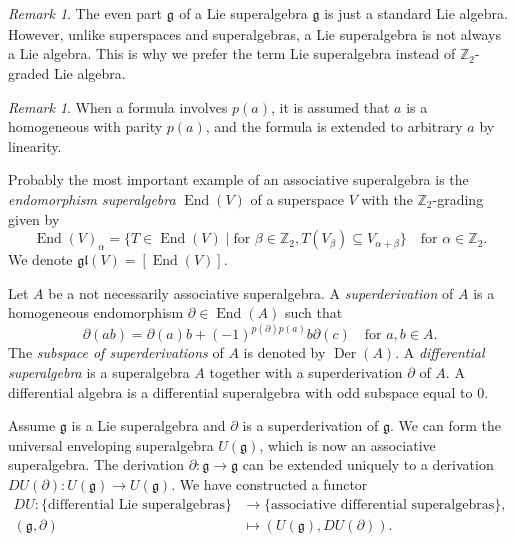 \documentclass[a4paper, 12pt, reqno]{amsart}
\theoremstyle{remark}
\newtheorem{remark}[theorem]{Remark}
\numberwithin{equation}{subsection}
\DeclareMathOperator{\End}{End}
\DeclareMathOperator{\zero}{\overline{0}}
\DeclareMathOperator{\Der}{Der}
\begin{document}
\begin{remark}
  \label{rmk:2}
  The even part $\mathfrak{g}_{\zero}$ of a Lie superalgebra $\mathfrak{g}$ is just a standard Lie algebra.
  However, unlike superspaces and superalgebras, a Lie superalgebra is not always a Lie algebra.
  This is why we prefer the term Lie superalgebra instead of $\mathbb{Z}_2$-graded Lie algebra.
\end{remark}

\begin{remark}
  \label{rmk:3}
  When a formula involves $p(a)$, it is assumed that $a$ is a homogeneous with parity $p(a)$, and the formula is extended to arbitrary $a$ by linearity.
\end{remark}

Probably the most important example of an associative superalgebra is the \emph{endomorphism superalgebra} $\End(V)$ of a superspace $V$ with the $\mathbb{Z}_2$-grading given by
\begin{equation*}
  \End(V)_{\alpha} = \{T \in \End(V) \mid \text{for }\beta \in \mathbb{Z}_2, T(V_{\beta}) \subseteq V_{\alpha + \beta}\} \quad \text{for }\alpha \in \mathbb{Z}_2.
\end{equation*}
We denote $\mathfrak{gl}(V) = [\End(V)]$.

Let $A$ be a not necessarily associative superalgebra.
A \emph{superderivation} of $A$ is a homogeneous endomorphism $\partial \in \End(A)$ such that
\begin{equation*}
  \partial(ab) = \partial(a)b + (-1)^{p(\partial)p(a)}b\partial(c) \quad \text{for }a, b \in A.
\end{equation*}
The \emph{subspace of superderivations} of $A$ is denoted by $\Der(A)$.
A \emph{differential superalgebra} is a superalgebra $A$ together with a superderivation $\partial$ of $A$.
A differential algebra is a differential superalgebra with odd subspace equal to $0$.

Assume $\mathfrak{g}$ is a Lie superalgebra and $\partial$ is a superderivation of $\mathfrak{g}$.
We can form the universal enveloping superalgebra $U(\mathfrak{g})$, which is now an associative superalgebra.
The derivation $\partial: \mathfrak{g} \to \mathfrak{g}$ can be extended uniquely to a derivation $DU(\partial): U(\mathfrak{g}) \to U(\mathfrak{g})$.
We have constructed a functor
\begin{align*}
  DU: \{\text{differential Lie superalgebras}\} &\to \{\text{associative differential superalgebras}\}, \\
  (\mathfrak{g}, \partial) &\mapsto (U(\mathfrak{g}), DU(\partial)).
\end{align*}
\end{document}
